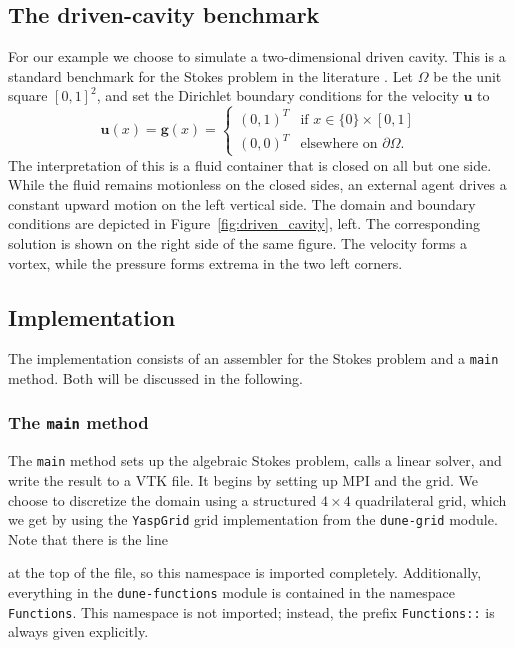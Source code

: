 \documentclass[a4paper,10pt,headings=normal,bibliography=totoc]{scrartcl}
\newcommand{\cpp}[1]{\lstinline[basicstyle=\ttfamily]!#1!}
\newcommand{\dunemodule}[1]{\texttt{#1}}
\begin{document}
\subsection{The driven-cavity benchmark}

For our example we choose to simulate a two-dimensional driven cavity.  This is a standard benchmark
for the Stokes problem in the literature \cite{schreiber1983driven}.
Let $\Omega$ be the unit square $[0,1]^2$, and set the Dirichlet
boundary conditions for the velocity $\mathbf{u}$ to
\begin{equation*}
 \mathbf{u}(x)
 =\mathbf{g}(x)
 =
 \begin{cases}
  (0,1)^T & \text{if $x \in \{0\} \times [0,1]$} \\
  (0,0)^T & \text{elsewhere on $\partial \Omega$}.
 \end{cases}
\end{equation*}
The interpretation of this is a fluid container that is closed on all but one side.  While the fluid remains
motionless on the closed sides, an external agent drives a constant upward motion on the left vertical side.
The domain and boundary conditions are depicted in Figure~\ref{fig:driven_cavity}, left.
The corresponding solution is shown on the right side of the same figure.  The velocity forms a vortex,
while the pressure forms extrema in the two left corners.


\subsection{Implementation}

The implementation consists of an assembler for the Stokes problem and a \cpp{main}
method. Both will be discussed in the following.

\subsubsection{The \texorpdfstring{\cpp{main}}{main} method}
\label{sec:stokes_example_main}

The \cpp{main} method sets up the algebraic Stokes problem, calls a linear solver,
and write the result to a VTK file. It begins by setting up MPI and the grid.
We choose to discretize the domain using a structured $4 \times 4$ quadrilateral
grid, which we get by using the \cpp{YaspGrid} grid implementation from the
\dunemodule{dune-grid} module.  Note that there is the line
%

%
at the top of the file, so this namespace is imported completely.  Additionally, everything in the \dunemodule{dune-functions}
module is contained in the namespace \cpp{Functions}.  This namespace is not imported; instead, the prefix \cpp{Functions::} is always
given explicitly.
\end{document}
